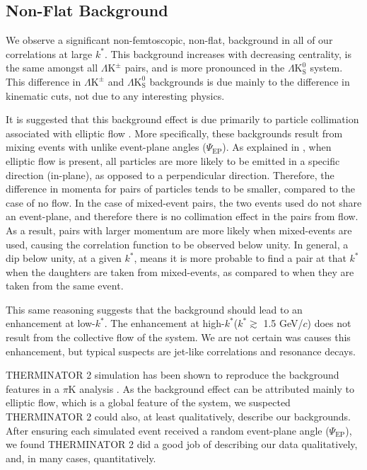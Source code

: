 \documentclass[ALICE,manyauthors]{cernphprep}
\newcommand{\kstar}{$k^{*}$\xspace}
\newcommand{\LamKpm}{$\Lambda\mathrm{K^{\pm}}$\xspace}
\newcommand{\LamKs}{$\Lambda\mathrm{K^{0}_{S}}$\xspace}
\begin{document}
\subsection{Non-Flat Background}
\label{NonFlatBackground}

We observe a significant non-femtoscopic, non-flat, background in all of our correlations at large \kstar.  
This background increases with decreasing centrality, is the same amongst all \LamKpm pairs, and is more pronounced in the \LamKs system.
This difference in \LamKpm and \LamKs backgrounds is due mainly to the difference in kinematic cuts, not due to any interesting physics.  


It is suggested that this background effect is due primarily to particle collimation associated with elliptic flow \cite{Kisiel:2017}.  
More specifically, these backgrounds result from mixing events with unlike event-plane angles ($\Psi_{\textrm{EP}}$).  
As explained in \cite{Kisiel:2017}, when elliptic flow is present, all particles are more likely to be emitted in a specific direction (in-plane), as opposed to a perpendicular direction.  
Therefore, the difference in momenta for pairs of particles tends to be smaller, compared to the case of no flow.  
In the case of mixed-event pairs, the two events used do not share an event-plane, and therefore there is no collimation effect in the pairs from flow.  
As a result, pairs with larger momentum are more likely when mixed-events are used, causing the correlation function to be observed below unity.  
In general, a dip below unity, at a given \kstar, means it is more probable to find a pair at that \kstar when the daughters are taken from mixed-events, as compared to when they are taken from the same event.

This same reasoning suggests that the background should lead to an enhancement at low-\kstar.  
The enhancement at high-\kstar (\kstar $\gtrsim$ 1.5 GeV/$c$) does not result from the collective flow of the system.  
We are not certain was causes this enhancement, but typical suspects are jet-like correlations and resonance decays.



THERMINATOR 2 simulation has been shown to reproduce the background features in a $\pi$K analysis \cite{Kisiel:2017}.  
As the background effect can be attributed mainly to elliptic flow, which is a global feature of the system, we suspected THERMINATOR 2 could also, at least qualitatively, describe our backgrounds.  
After ensuring each simulated event received a random event-plane angle ($\Psi_{\mathrm{EP}}$), we found THERMINATOR 2 did a good job of describing our data qualitatively, and, in many cases, quantitatively.  
\end{document}
